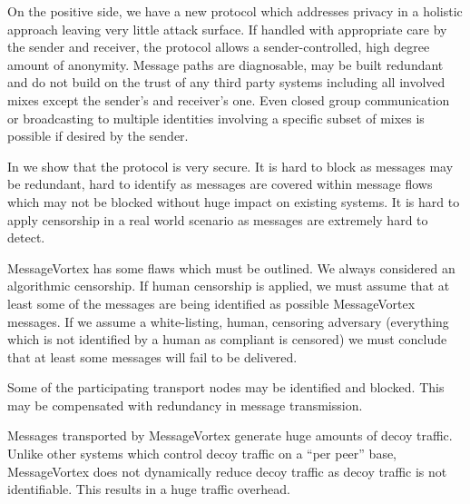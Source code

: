 \documentclass[9pt,journal,compsoc]{IEEEtran}
\begin{document}
On the positive side, we have a new protocol which addresses privacy in a holistic approach leaving very little attack surface. If handled with appropriate care by the sender and receiver, the protocol allows a sender-controlled, high degree amount of anonymity. Message paths are diagnosable, may be built redundant and do not build on the trust of any third party systems including all involved mixes except the sender's and receiver's one. Even closed group communication or broadcasting to multiple identities involving a specific subset of mixes is possible if desired by the sender.

In \cite{messageVortex} we show that the protocol is very secure. It is hard to block as messages may be redundant, hard to identify as messages are covered within message flows which may not be blocked without huge impact on existing systems. It is hard to apply censorship in a real world scenario as messages are extremely hard to detect. 

MessageVortex has some flaws which must be outlined. We always considered an algorithmic censorship. If human censorship is applied, we must assume that at least some of the messages are being identified as possible MessageVortex messages. If we assume a white-listing, human, censoring adversary (everything which is not identified by a human as compliant is censored) we must conclude that at least some messages will fail to be delivered. 

Some of the participating transport nodes may be identified and blocked. This may be compensated with redundancy in message transmission. 

Messages transported by MessageVortex generate huge amounts of decoy traffic. Unlike other systems which control decoy traffic on a ``per peer'' base, MessageVortex does not dynamically reduce decoy traffic as decoy traffic is not identifiable. This results in a huge traffic overhead.



%
\end{document}
